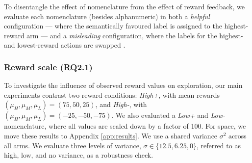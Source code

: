 \documentclass{article} %
\begin{document}
To disentangle the effect of nomenclature from the effect of reward feedback, we evaluate each nomenclature (besides alphanumeric) in both a \textit{helpful} configuration --- where the semantically favoured label is assigned to the highest-reward arm --- and a \textit{misleading} configuration, where the labels for the highest- and lowest-reward actions are swapped .


\begin{table}[ht]
\centering
{}
\caption{Helpful action nomenclature examples for the high positive reward scale. In the misleading case, the labels for the highest and lowest rewards are swapped. Note that the labels for sentiment and alphanumeric are examples - we randomly sample these labels from a set at the start of each run to reduce the bias from a single label.}
\label{tab:nomenclatures}
\end{table}

\subsubsection{Reward scale (RQ2.1)}
\label{sec:reward_scale}
To investigate the influence of observed reward values on exploration, our main experiments contrast two reward conditions: \textit{High+}, with mean rewards $(\mu_H, \mu_M, \mu_L) = (75, 50, 25)$, and \textit{High-}, with $(\mu_H, \mu_M, \mu_L) = (-25, -50, -75)$. We also evaluated a \textit{Low+} and \textit{Low-} nomenclature, where all values are scaled down by a factor of 100. For space, we move these results to Appendix \ref{app:results}. We use a shared variance $\sigma^2$ across all arms. We evaluate three levels of variance, $\sigma \in \{12.5, 6.25, 0\}$, referred to as high, low, and no variance, as a robustness check. 
\end{document}
